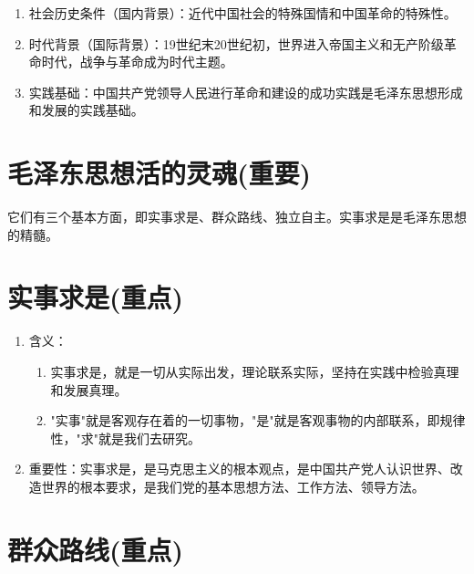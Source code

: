 \documentclass[12pt, a4paper, oneside]{ctexbook}
\begin{document}
\begin{enumerate}[label=（\arabic*）]
\item 社会历史条件（国内背景）：近代中国社会的特殊国情和中国革命的特殊性。

\item 时代背景（国际背景）：19世纪末20世纪初，世界进入帝国主义和无产阶级革命时代，战争与革命成为时代主题。

\item 实践基础：中国共产党领导人民进行革命和建设的成功实践是毛泽东思想形成和发展的实践基础。
\end{enumerate}

\section{毛泽东思想活的灵魂(重要)}
它们有三个基本方面，即实事求是、群众路线、独立自主。实事求是是毛泽东思想的精髓。

\section{实事求是(重点)}

\begin{enumerate}[label=（\arabic*）]
\item 含义：
\begin{enumerate}[label=（\roman*）]
\item 实事求是，就是一切从实际出发，理论联系实际，坚持在实践中检验真理和发展真理。

\item "实事"就是客观存在着的一切事物，"是"就是客观事物的内部联系，即规律性，"求"就是我们去研究。
\end{enumerate}

\item 重要性：实事求是，是马克思主义的根本观点，是中国共产党人认识世界、改造世界的根本要求，是我们党的基本思想方法、工作方法、领导方法。
\end{enumerate}

\section{群众路线(重点)}
\end{document}
